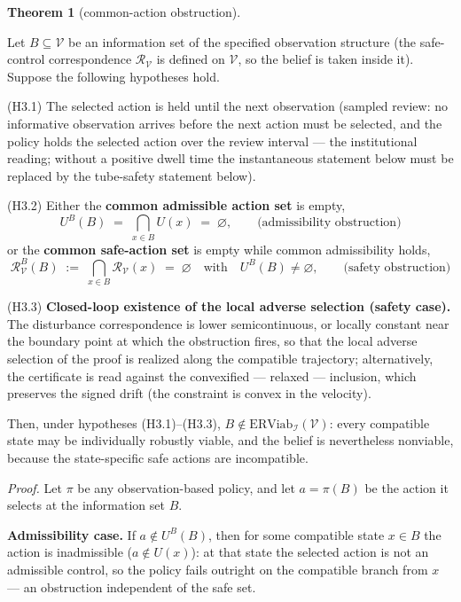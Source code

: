 \documentclass[11pt]{article}
\theoremstyle{definition}
\newtheorem{theorem}{Theorem}
\begin{document}
\begin{theorem}[common-action obstruction]\label{thm:common-action}

Let \(B \subseteq \mathcal{V}\) be an information set of the specified observation structure (the safe-control correspondence
\(\mathcal{R}_{\mathcal{V}}\) is defined on \(\mathcal{V}\), so the
belief is taken inside it). Suppose the following hypotheses hold.

(H3.1) The selected action is held until the next observation (sampled
review: no informative observation arrives before the next action must
be selected, and the policy holds the selected action over the review
interval --- the institutional reading; without a positive dwell time
the instantaneous statement below must be replaced by the tube-safety statement below).

(H3.2) Either the \textbf{common admissible action set} is empty,
\[U^B(B) \;=\; \bigcap_{x \in B} U(x) \;=\; \varnothing, \qquad \text{(admissibility obstruction)}\]
or the \textbf{common safe-action set} is empty while common
admissibility holds,
\[\mathcal{R}_{\mathcal{V}}^B(B) \;:=\; \bigcap_{x \in B} \mathcal{R}_{\mathcal{V}}(x) \;=\; \varnothing \quad \text{with} \quad U^B(B) \neq \varnothing, \tag{2} \qquad \text{(safety obstruction)}\]

(H3.3) \textbf{Closed-loop existence of the local adverse selection
(safety case).} The disturbance correspondence is lower semicontinuous,
or locally constant near the boundary point at which the obstruction
fires, so that the local adverse selection of the proof is realized
along the compatible trajectory; alternatively, the certificate is read
against the convexified --- relaxed --- inclusion, which preserves the
signed drift (the constraint is convex in the velocity).

Then, under hypotheses (H3.1)--(H3.3),
\(B \notin \mathrm{ERViab}_{\mathcal{I}}(\mathcal{V})\): every
compatible state may be individually robustly viable, and the belief is
nevertheless nonviable, because the state-specific safe actions are
incompatible.

\end{theorem}

\emph{Proof.} Let \(\pi\) be any observation-based policy, and let
\(a = \pi(B)\) be the action it selects at the information set \(B\).

\textbf{Admissibility case.} If \(a \notin U^B(B)\), then for some
compatible state \(x \in B\) the action is inadmissible
(\(a \notin U(x)\)): at that state the selected action is not an
admissible control, so the policy fails outright on the compatible
branch from \(x\) --- an obstruction independent of the safe set.
\end{document}
